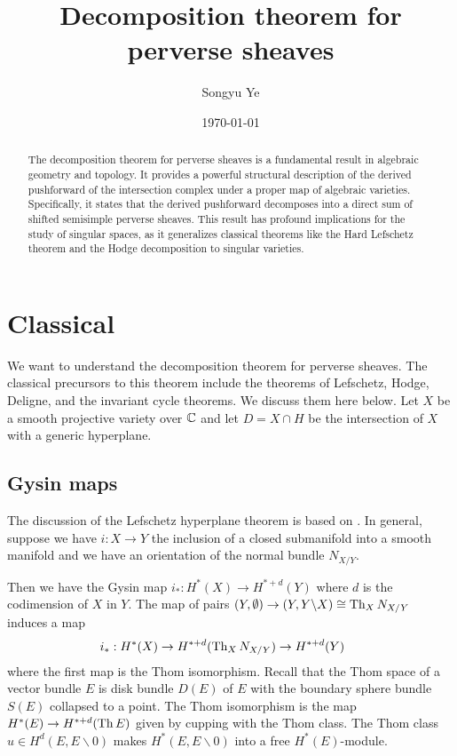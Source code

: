 \documentclass[12pt]{article}
\title{Decomposition theorem for perverse sheaves}
\author{Songyu Ye}
\date{\today}
\begin{document}
\notestitle

\begin{abstract}
    The decomposition theorem for perverse sheaves is a fundamental result in algebraic geometry and topology. It provides a powerful structural description of the derived pushforward of the intersection complex under a proper map of algebraic varieties. Specifically, it states that the derived pushforward decomposes into a direct sum of shifted semisimple perverse sheaves. This result has profound implications for the study of singular spaces, as it generalizes classical theorems like the Hard Lefschetz theorem and the Hodge decomposition to singular varieties.
\end{abstract}

\tableofcontents

\section{Classical}
We want to understand the decomposition theorem for perverse sheaves. The classical
precursors to this theorem include the theorems of Lefschetz, Hodge, Deligne, and the invariant cycle theorems.
We discuss them here below. Let $X$ be a smooth projective variety over $\mathbb{C}$ and let $D = X \cap H$ be
the intersection of $X$ with a generic hyperplane.

\subsection{Gysin maps}
The discussion of the Lefschetz hyperplane theorem is based on \cite{griffiths-harris}. In general, suppose we have $i:X\to Y$ the inclusion of a
closed submanifold into a smooth manifold and we have an orientation of the normal
bundle $N_{X/Y}$.

Then we have the Gysin map $i_*:H^*(X)\to H^{*+d}(Y)$ where $d$ is the codimension of $X$ in $Y$. The map of pairs $(Y,\emptyset)\to (Y,Y\backslash X) \cong
    \operatorname{Th}_X N_{X/Y}$ induces a map \begin{align*}
    i_*:H^*(X) & \to H^{*+d}(\operatorname{Th}_X N_{X/Y}) \to H^{*+d}(Y)\
\end{align*} where the first map is the Thom isomorphism.
Recall that the Thom space of a vector bundle $E$ is disk bundle $D(E)$ of $E$ with the boundary
sphere bundle $S(E)$ collapsed to a point. The Thom isomorphism is the map $H^*(E)\to H^{*+d}(\operatorname{Th} E)$
given by cupping with the Thom class. The Thom class $u \in H^d(E,E\backslash 0)$ makes
$H^*(E,E\backslash 0)$ into a free $H^*(E)$-module.
\end{document}
